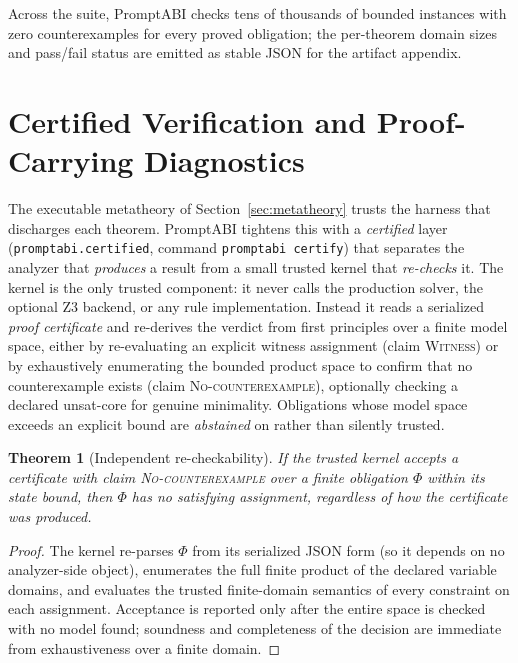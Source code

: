 \documentclass[10pt]{article}
\newtheorem{theorem}{Theorem}
\begin{document}
Across the suite, PromptABI checks tens of thousands of bounded instances with
zero counterexamples for every proved obligation; the per-theorem domain sizes
and pass/fail status are emitted as stable JSON for the artifact appendix.


\section{Certified Verification and Proof-Carrying Diagnostics}
\label{sec:certified}

The executable metatheory of Section~\ref{sec:metatheory} trusts the harness
that discharges each theorem. PromptABI tightens this with a \emph{certified}
layer (\texttt{promptabi.\allowbreak certified}, command \texttt{promptabi
certify}) that separates the analyzer that \emph{produces} a result from a small
trusted kernel that \emph{re-checks} it. The kernel is the only trusted
component: it never calls the production solver, the optional Z3 backend, or any
rule implementation. Instead it reads a serialized \emph{proof certificate} and
re-derives the verdict from first principles over a finite model space, either by
re-evaluating an explicit witness assignment (claim \textsc{Witness}) or by
exhaustively enumerating the bounded product space to confirm that no
counterexample exists (claim \textsc{No-counterexample}), optionally checking a
declared unsat-core for genuine minimality. Obligations whose model space exceeds
an explicit bound are \emph{abstained} on rather than silently trusted.

\begin{theorem}[Independent re-checkability]
If the trusted kernel accepts a certificate with claim \textsc{No-coun\-ter\-example}
over a finite obligation $\Phi$ within its state bound, then $\Phi$ has no
satisfying assignment, regardless of how the certificate was produced.
\end{theorem}
\begin{proof}
The kernel re-parses $\Phi$ from its serialized JSON form (so it depends on no
analyzer-side object), enumerates the full finite product of the declared
variable domains, and evaluates the trusted finite-domain semantics of every
constraint on each assignment. Acceptance is reported only after the entire space
is checked with no model found; soundness and completeness of the decision are
immediate from exhaustiveness over a finite domain.
\end{proof}
\end{document}
